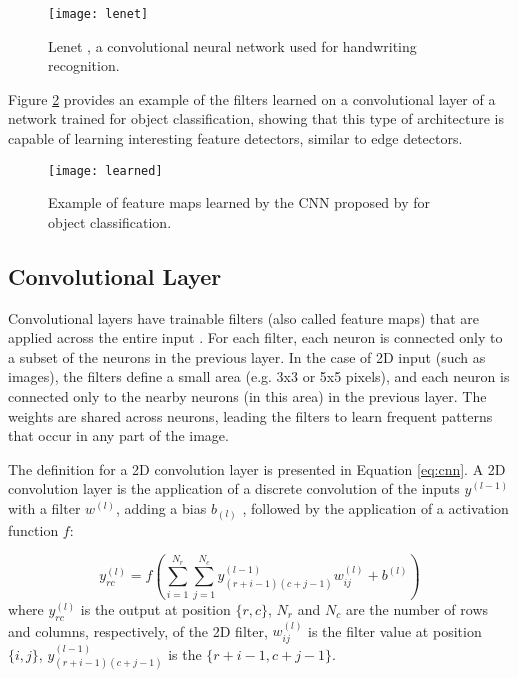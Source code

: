 \begin{figure}[!htb]
\centering
\texttt{[image: lenet]}
\caption{Lenet \cite{lecun1998gradient}, a convolutional neural network used for handwriting recognition.}
\label{lenet}
\end{figure}

Figure \ref{learned} provides an example of the filters learned on a convolutional layer of a network trained for object classification, showing that this type of architecture is
capable of learning interesting feature detectors, similar to edge detectors.
\begin{figure}[!htb]
\centering
\texttt{[image: learned]}
\caption{Example of feature maps learned by the CNN proposed by \cite{krizhevsky2012imagenet} for object classification.}
\label{learned}
\end{figure}


\subsection{Convolutional Layer}
Convolutional layers have trainable filters (also called feature maps) that are applied
across the entire input \cite{lecun1995convolutional}. For each filter, each neuron is connected only to a subset of
the neurons in the previous layer. In the case of 2D input (such as images), the filters
define a small area (e.g. 3x3 or 5x5 pixels), and each neuron is connected only to the
nearby neurons (in this area) in the previous layer. The weights are shared across neurons,
leading the filters to learn frequent patterns that occur in any part of the image.

The definition for a 2D convolution layer is presented in Equation \ref{eq:cnn}. A 2D convolution layer is the application of a discrete convolution of the inputs $y^{(l-1)}$ with a filter $w^{(l)}$, adding a bias $b_{(l)}$ , followed by the application of a activation function $f$:

\begin{equation}
y^{(l)}_{rc} = f(\sum_{i=1}^{N_{r}} \sum_{j=1}^{N_{c}} y^{(l-1)}_{(r+i-1)(c+j-1)} w^{(l)}_{ij} + b^{(l)} )
\label{eq:cnn}
\end{equation}
where $y^{(l)}_{rc}$ is the output at position $\{r,c\}$, $N_{r}$ and $N_{c}$ are the number of rows and columns, respectively, of the 2D filter, $w^{(l)}_{ij}$ is the filter value at position $\{i,j\}$, $y^{(l-1)}_{(r+i-1)(c+j-1)}$ is the $\{r+i-1,c+j-1\}$.


